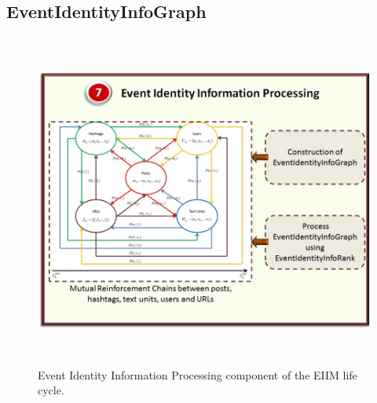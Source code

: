 \subsection{EventIdentityInfoGraph\label{eventidentityinfograph}}

\begin{figure}[htbp]
  \caption{Event Identity Information Processing component of the EIIM life cycle.}
  \centering
    \includegraphics[width=14cm,height=11cm]{Figures/EIIMComponents/EventIdentityInformationProcessing.jpg}
\end{figure}


